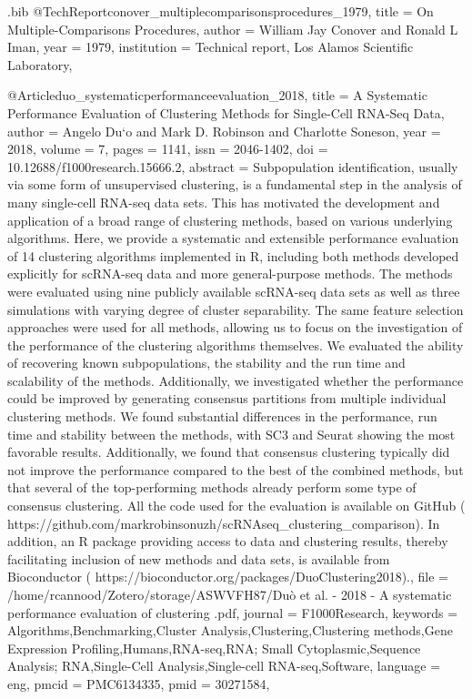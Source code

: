 \documentclass[
  table,
  10pt,
  a4paper]{article}
\begin{document}
\begin{filecontents}{\jobname.bib}
@TechReport{conover_multiplecomparisonsprocedures_1979,
	title = {On Multiple-Comparisons Procedures},
	author = {William Jay Conover and Ronald L Iman},
	year = {1979},
	institution = {{Technical report, Los Alamos Scientific Laboratory}},
}

@Article{duo_systematicperformanceevaluation_2018,
	title = {A Systematic Performance Evaluation of Clustering Methods for Single-Cell {{RNA}}-Seq Data},
	author = {Angelo Du{\a`o} and Mark D. Robinson and Charlotte Soneson},
	year = {2018},
	volume = {7},
	pages = {1141},
	issn = {2046-1402},
	doi = {10.12688/f1000research.15666.2},
	abstract = {Subpopulation identification, usually via some form of unsupervised clustering, is a fundamental step in the analysis of many single-cell RNA-seq data sets. This has motivated the development and application of a broad range of clustering methods, based on various underlying algorithms. Here, we provide a systematic and extensible performance evaluation of 14 clustering algorithms implemented in R, including both methods developed explicitly for scRNA-seq data and more general-purpose methods. The methods were evaluated using nine publicly available scRNA-seq data sets as well as three simulations with varying degree of cluster separability. The same feature selection approaches were used for all methods, allowing us to focus on the investigation of the performance of the clustering algorithms themselves. We evaluated the ability of recovering known subpopulations, the stability and the run time and scalability of the methods. Additionally, we investigated whether the performance could be improved by generating consensus partitions from multiple individual clustering methods. We found substantial differences in the performance, run time and stability between the methods, with SC3 and Seurat showing the most favorable results. Additionally, we found that consensus clustering typically did not improve the performance compared to the best of the combined methods, but that several of the top-performing methods already perform some type of consensus clustering. All the code used for the evaluation is available on GitHub ( https://github.com/markrobinsonuzh/scRNAseq\_clustering\_comparison). In addition, an R package providing access to data and clustering results, thereby facilitating inclusion of new methods and data sets, is available from Bioconductor ( https://bioconductor.org/packages/DuoClustering2018).},
	file = {/home/rcannood/Zotero/storage/ASWVFH87/Duò et al. - 2018 - A systematic performance evaluation of clustering .pdf},
	journal = {F1000Research},
	keywords = {Algorithms,Benchmarking,Cluster Analysis,Clustering,Clustering methods,Gene Expression Profiling,Humans,RNA-seq,RNA; Small Cytoplasmic,Sequence Analysis; RNA,Single-Cell Analysis,Single-cell RNA-seq,Software},
	language = {eng},
	pmcid = {PMC6134335},
	pmid = {30271584},
}


\end{filecontents}
\end{document}
